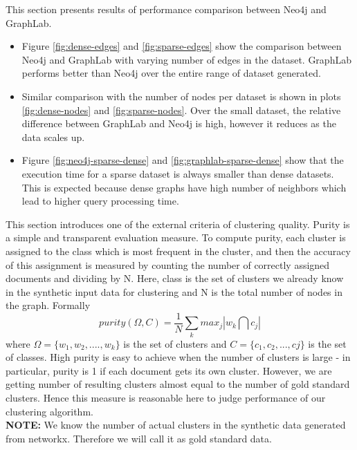 This section presents results of performance comparison between Neo4j and GraphLab. 
\begin{itemize}
\item Figure \ref{fig:dense-edges} and \ref{fig:sparse-edges} show the comparison between Neo4j and GraphLab with varying number of edges in the dataset. GraphLab performs better than Neo4j over the entire range of dataset generated.
\item Similar comparison with the number of nodes per dataset is shown in plots \ref{fig:dense-nodes} and \ref{fig:sparse-nodes}. Over the small dataset, the relative difference between GraphLab and Neo4j is high, however it reduces as the data scales up.
\item Figure \ref{fig:neo4j-sparse-dense} and \ref{fig:graphlab-sparse-dense} show that the execution time for a sparse dataset is always smaller than dense datasets. This is expected because dense graphs have high number of neighbors which lead to higher query processing time.
\end{itemize}
This section introduces one of the external criteria of clustering quality. Purity is a simple and transparent evaluation measure. To compute purity, each cluster is assigned to the class which is most frequent in the cluster, and then the accuracy of this assignment is measured by counting the number of correctly assigned documents and dividing by N. Here, class is the set of clusters we already know in the synthetic input data for clustering and N is the total number of nodes in the graph. Formally
\begin{equation}
purity(\Omega, C ) = \frac{1}{N}\sum_{k} max_{j}|w_{k} \bigcap c_{j}|
\end{equation}
where $\Omega = \{w_{1}, w_{2},....,w_{k}\}$ is the set of clusters and $C=\{c_{1},c_{2},...,c{j}\}$ is the set of classes.
High purity is easy to achieve when the number of clusters is large - in particular, purity is 1 if each document gets its own cluster. However, we are getting number of resulting clusters almost equal to the number of gold standard clusters. Hence this measure is reasonable here to judge performance of our clustering algorithm.\\
\textbf{NOTE:} We know the number of actual clusters in the synthetic data generated from networkx. Therefore we will call it as gold standard data.

